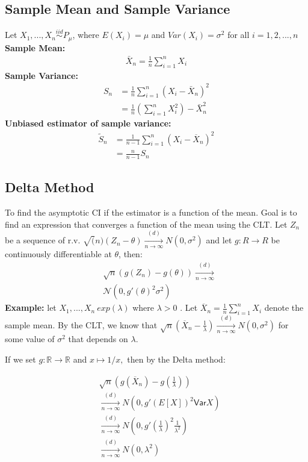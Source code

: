 \subsection{Sample Mean and Sample Variance}
Let $X_1, ..., X_n \stackrel{iid}{\sim} P_{\mu}$, where $E(X_i)=\mu$ and $Var(X_i)=\sigma^2$ for all $i=1,2,...,n$\\
\textbf{Sample Mean:}
\begin{align*}
\bar{X}_n= \frac{1}{n} \sum_{i=1}^{n} X_i
\end{align*}
\textbf{Sample Variance:}
\begin{align*}
S_n &= \frac{1}{n} \sum_{i=1}^{n} (X_i - \bar{X}_n)^2\\ 
&= \frac{1}{n} (\sum_{i=1}^{n} X_i^2) - \bar{X}_n^2
\end{align*}
\textbf{Unbiased estimator of sample variance:}
\begin{align*}
\tilde{S}_n &= \displaystyle  \frac{1}{n-1} \sum _{i=1}^ n \left(X_ i - \overline{X}_ n\right)^2\\
&= \frac{n}{n-1} S_n
\end{align*}
\subsection{Delta Method}

To find the asymptotic CI if the estimator is a function of the mean. Goal is to find an expression that converges a function of the mean using the CLT. Let $Z_n$ be a sequence of r.v. $\sqrt(n) (Z_n-\theta) \xrightarrow[n \rightarrow \infty]{(d)} N(0,\sigma^2)$ and let $g: R\longrightarrow R$ be continuously differentiable at $\theta$, then:
\begin{align*}
&\sqrt{n}(g(Z_n) - g(\theta)) \xrightarrow [n \to \infty ]{(d)}\\
&\mathcal{N}(0, g'(\theta )^2 \sigma ^2)
\end{align*}
\textbf{Example:} let  $X_1,... ,X_n ~ exp(\lambda)$  where  $\lambda>0$ . Let  $\overline{X}_ n= \frac{1}{n} \sum _{i = 1}^ n X_ i$ denote the sample mean. By the CLT, we know that $\sqrt{n}\left(\overline{X}_ n - \frac{1}{\lambda }\right) \xrightarrow [n \to \infty ]{(d)} N(0, \sigma ^2)$ for some value of  $\sigma^2$  that depends on  $\lambda$.

If we set $g: \displaystyle \mathbb {R} \to \mathbb {R}$ and $\displaystyle x \mapsto 1/x,$ then by the Delta method:

\begin{align*}
&\sqrt{n}\left( g(\overline{X}_ n) - g\left(\frac{1}{\lambda }\right) \right)\\
&\xrightarrow [n \to \infty ]{(d)} N(0, g'(E[X])^2\textsf{Var}{X})\\
&\xrightarrow [n \to \infty ]{(d)} N(0, g'\left(\frac{1}{\lambda }\right)^2\frac{1}{\lambda ^2})\\
&\xrightarrow [n \to \infty ]{(d)} N(0, \lambda^2)
\end{align*}